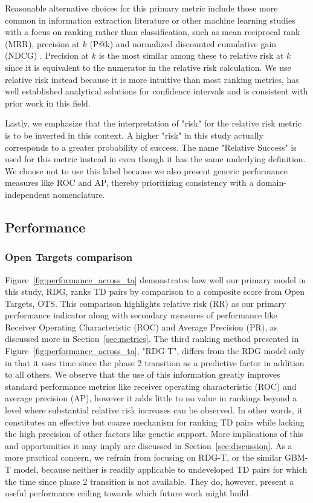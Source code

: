 \documentclass{article}
\begin{document}
Reasonable alternative choices for this primary metric include those more common in information extraction literature or other machine learning studies with a focus on ranking rather than classification, such as mean reciprocal rank (MRR), precision at $k$ (P@k) and normalized discounted cumulative gain (NDCG) \cite{hoyt2022unified,moffat2022batch}. Precision at $k$ is the most similar among these to relative risk at $k$ since it is equivalent to the numerator in the relative risk calculation. We use relative risk instead because it is more intuitive than most ranking metrics, has well established analytical solutions for confidence intervals \cite{Katz1978-mo} and is consistent with prior work in this field.

Lastly, we emphasize that the interpretation of "risk" for the relative risk metric is to be inverted in this context. A higher "risk" in this study actually corresponds to a greater probability of success. The name "Relative Success" is used for this metric instead in \cite{Minikel2023.06.23.23291765} even though it has the same underlying definition. We choose not to use this label because we also present generic performance measures like ROC and AP, thereby prioritizing consistency with a domain-independent nomenclature.

\subsection{Performance}
\label{sec:results_performance}

\subsubsection{Open Targets comparison}

Figure~\ref{fig:performance_across_ta} demonstrates how well our primary model in this study, RDG, ranks TD pairs by comparison to a composite score from Open Targets, OTS. This comparison highlights relative risk (RR) as our primary performance indicator along with secondary measures of performance like Receiver Operating Characteristic (ROC) and Average Precision (PR), as discussed more in Section~\ref{sec:metrics}. The third ranking method presented in Figure~\ref{fig:performance_across_ta}, "RDG-T", differs from the RDG model only in that it uses time since the phase 2 transition as a predictive factor in addition to all others. We observe that the use of this information greatly improves standard performance metrics like receiver operating characteristic (ROC) and average precision (AP), however it adds little to no value in rankings beyond a level where substantial relative risk increases can be observed. In other words, it constitutes an effective but coarse mechanism for ranking TD pairs while lacking the high precision of other factors like genetic support. More implications of this and opportunities it may imply are discussed in Section~\ref{sec:discussion}. As a more practical concern, we refrain from focusing on RDG-T, or the similar GBM-T model, because neither is readily applicable to undeveloped TD pairs for which the time since phase 2 transition is not available. They do, however, present a useful performance ceiling towards which future work might build.
\end{document}

